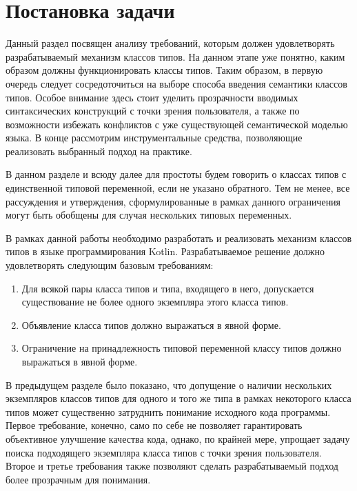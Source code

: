 \chapter{Постановка задачи \label{sct:problem-constraints}}

Данный раздел посвящен анализу требований, которым должен удовлетворять разрабатываемый механизм классов типов. На данном этапе уже понятно, каким образом должны функционировать классы типов. Таким образом, в первую очередь следует сосредоточиться на выборе способа введения семантики классов типов. Особое внимание здесь стоит уделить прозрачности вводимых синтаксических конструкций с точки зрения пользователя, а также по возможности избежать конфликтов с уже существующей семантической моделью языка. В конце рассмотрим инструментальные средства, позволяющие реализовать выбранный подход на практике.

В данном разделе и всюду далее для простоты будем говорить о классах типов с единственной типовой переменной, если не указано обратного. Тем не менее, все рассуждения и утверждения, сформулированные в рамках данного ограничения могут быть обобщены для случая нескольких типовых переменных.

В рамках данной работы необходимо разработать и реализовать механизм классов типов в языке программирования Kotlin. Разрабатываемое решение должно удовлетворять следующим базовым требованиям:
\begin{enumerate}
    \item Для всякой пары класса типов и типа, входящего в него, допускается существование не более одного экземпляра этого класса типов.
    \item Объявление класса типов должно выражаться в явной форме.
    \item Ограничение на принадлежность типовой переменной классу типов должно выражаться в явной форме.
\end{enumerate} 
В предыдущем разделе было показано, что допущение о наличии нескольких экземпляров классов типов для одного и того же типа в рамках некоторого класса типов может существенно затруднить понимание исходного кода программы. Первое требование, конечно, само по себе не позволяет гарантировать объективное улучшение качества кода, однако, по крайней мере, упрощает задачу поиска подходящего экземпляра класса типов с точки зрения пользователя. Второе и третье требования также позволяют сделать разрабатываемый подход более прозрачным для понимания. 


